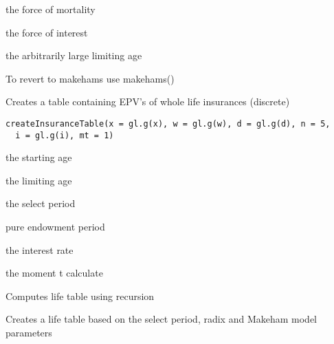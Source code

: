 \documentclass[a4paper]{book}
\begin{document}
%
\begin{Arguments}
\begin{ldescription}
\item[\code{mu}] the force of mortality

\item[\code{delta}] the force of interest

\item[\code{w}] the arbitrarily large limiting age
\end{ldescription}
\end{Arguments}
%
\begin{Details}\relax
To revert to makehams use makehams()
\end{Details}
%
\begin{Description}\relax
Creates a table containing EPV's of whole life insurances (discrete)
\end{Description}
%
\begin{Usage}
\begin{verbatim}
createInsuranceTable(x = gl.g(x), w = gl.g(w), d = gl.g(d), n = 5,
  i = gl.g(i), mt = 1)
\end{verbatim}
\end{Usage}
%
\begin{Arguments}
\begin{ldescription}
\item[\code{x}] the starting age

\item[\code{w}] the limiting age

\item[\code{d}] the select period

\item[\code{n}] pure endowment period

\item[\code{i}] the interest rate

\item[\code{mt}] the moment t calculate
\end{ldescription}
\end{Arguments}
%
\begin{Details}\relax
Computes life table using recursion
\end{Details}
%
\begin{Description}\relax
Creates a life table based on the select period, radix and Makeham model parameters
\end{Description}
\end{document}

